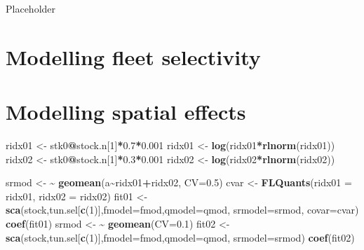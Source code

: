 \documentclass[
]{book}
\newenvironment{Shaded}{\begin{snugshade}}{\end{snugshade}}
\newcommand{\AttributeTok}[1]{\textcolor[rgb]{0.13,0.29,0.53}{#1}}
\newcommand{\DecValTok}[1]{\textcolor[rgb]{0.00,0.00,0.81}{#1}}
\newcommand{\ErrorTok}[1]{\textcolor[rgb]{0.64,0.00,0.00}{\textbf{#1}}}
\newcommand{\FloatTok}[1]{\textcolor[rgb]{0.00,0.00,0.81}{#1}}
\newcommand{\FunctionTok}[1]{\textcolor[rgb]{0.13,0.29,0.53}{\textbf{#1}}}
\newcommand{\NormalTok}[1]{#1}
\newcommand{\OtherTok}[1]{\textcolor[rgb]{0.56,0.35,0.01}{#1}}
\newcommand{\SpecialCharTok}[1]{\textcolor[rgb]{0.81,0.36,0.00}{\textbf{#1}}}
\begin{document}
Placeholder

\hypertarget{modelling-fleet-selectivity}{%
\chapter{Modelling fleet selectivity}\label{modelling-fleet-selectivity}}

\hypertarget{modelling-spatial-effects}{%
\chapter{Modelling spatial effects}\label{modelling-spatial-effects}}

\begin{Shaded}
\begin{Highlighting}[]
\NormalTok{ridx01 }\OtherTok{\textless{}{-}}\NormalTok{ stk0}\SpecialCharTok{@}\NormalTok{stock.n[}\DecValTok{1}\NormalTok{]}\SpecialCharTok{*}\FloatTok{0.7}\SpecialCharTok{*}\FloatTok{0.001}
\NormalTok{ridx01 }\OtherTok{\textless{}{-}} \FunctionTok{log}\NormalTok{(ridx01}\SpecialCharTok{*}\FunctionTok{rlnorm}\NormalTok{(ridx01))}
\NormalTok{ridx02 }\OtherTok{\textless{}{-}}\NormalTok{ stk0}\SpecialCharTok{@}\NormalTok{stock.n[}\DecValTok{1}\NormalTok{]}\SpecialCharTok{*}\FloatTok{0.3}\SpecialCharTok{*}\FloatTok{0.001}
\NormalTok{ridx02 }\OtherTok{\textless{}{-}} \FunctionTok{log}\NormalTok{(ridx02}\SpecialCharTok{*}\FunctionTok{rlnorm}\NormalTok{(ridx02))}

\NormalTok{srmod }\OtherTok{\textless{}{-}} \ErrorTok{\textasciitilde{}} \FunctionTok{geomean}\NormalTok{(a}\SpecialCharTok{\textasciitilde{}}\NormalTok{ridx01}\SpecialCharTok{+}\NormalTok{ridx02, }\AttributeTok{CV=}\FloatTok{0.5}\NormalTok{)}
\NormalTok{cvar }\OtherTok{\textless{}{-}} \FunctionTok{FLQuants}\NormalTok{(}\AttributeTok{ridx01 =}\NormalTok{ ridx01, }\AttributeTok{ridx02 =}\NormalTok{ ridx02)}
\NormalTok{fit01 }\OtherTok{\textless{}{-}} \FunctionTok{sca}\NormalTok{(stock,tun.sel[}\FunctionTok{c}\NormalTok{(}\DecValTok{1}\NormalTok{)],}\AttributeTok{fmodel=}\NormalTok{fmod,}\AttributeTok{qmodel=}\NormalTok{qmod, }\AttributeTok{srmodel=}\NormalTok{srmod, }\AttributeTok{covar=}\NormalTok{cvar)}
\FunctionTok{coef}\NormalTok{(fit01)}
\NormalTok{srmod }\OtherTok{\textless{}{-}} \ErrorTok{\textasciitilde{}} \FunctionTok{geomean}\NormalTok{(}\AttributeTok{CV=}\FloatTok{0.1}\NormalTok{)}
\NormalTok{fit02 }\OtherTok{\textless{}{-}} \FunctionTok{sca}\NormalTok{(stock,tun.sel[}\FunctionTok{c}\NormalTok{(}\DecValTok{1}\NormalTok{)],}\AttributeTok{fmodel=}\NormalTok{fmod,}\AttributeTok{qmodel=}\NormalTok{qmod, }\AttributeTok{srmodel=}\NormalTok{srmod)}
\FunctionTok{coef}\NormalTok{(fit02)}
\end{Highlighting}
\end{Shaded}
\end{document}
